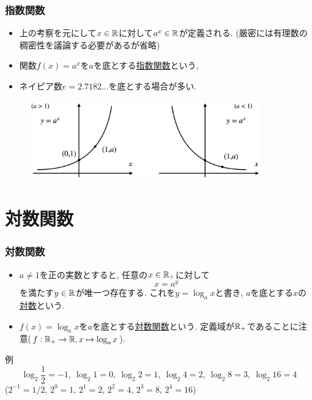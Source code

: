 \begin{frame}
\frametitle{指数関数}

\begin{itemize}
\item 上の考察を元にして$x \in \mathbb{R}$に対して$a^x \in \mathbb{R}$が定義される. (厳密には有理数の稠密性を議論する必要があるが省略)
\item 関数$f(x)=a^x$を$a$を底とする\underline{指数関数}という, 
\item ネイピア数$e=2.7182\dots$を底とする場合が多い. 
\end{itemize}


\vspace{-1mm}

\begin{figure}[htbp]
 \begin{center} 
  \includegraphics[width=100mm]{calculus2/exp.png}
 \end{center}
\end{figure}
\vspace{-4mm}


\end{frame}





\section{対数関数}

\begin{frame}
\frametitle{対数関数}   

\begin{itemize}
\item 
$a \ne 1$を正の実数とすると, 任意の$x \in \mathbb{R}_+$に対して
$$
x=a^y
$$
を満たす$y \in \mathbb{R}$が唯一つ存在する. これを$y=\log_a x$と書き, $a$を底とする$x$の\underline{対数}という. 
\item $f(x)=\log_a x$を$a$を底とする\underline{対数関数}という. 
定義域が$\mathbb{R}_+$であることに注意($f: \mathbb{R}_{+} \rightarrow \mathbb{R}, x \mapsto \log_a x$).   
\end{itemize}

例
$$
 \log_2 \frac{1}{2}=-1, \  \log_2 1=0, \ \log_2 2=1, \  \log_2 4=2, \  \log_2 8=3, \  \log_2 16=4
$$
($2^{-1}=1/2$, $2^{0}=1$, $2^{1}=2$, $2^{2}=4$, $2^{3}=8$, $2^{4}=16$)


\end{frame}



